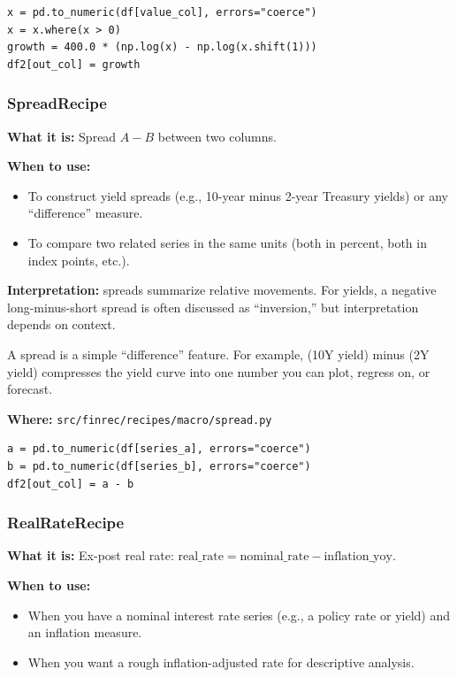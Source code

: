 \documentclass[11pt,a4paper]{article}
\begin{document}
\begin{lstlisting}
x = pd.to_numeric(df[value_col], errors="coerce")
x = x.where(x > 0)
growth = 400.0 * (np.log(x) - np.log(x.shift(1)))
df2[out_col] = growth
\end{lstlisting}

\subsubsection{SpreadRecipe}\label{sec:spread}

\textbf{What it is:} Spread $A - B$ between two columns.

\textbf{When to use:}
\begin{itemize}[leftmargin=2em]
  \item To construct yield spreads (e.g., 10-year minus 2-year Treasury yields) or any ``difference'' measure.
  \item To compare two related series in the same units (both in percent, both in index points, etc.).
\end{itemize}

\textbf{Interpretation:} spreads summarize relative movements. For yields, a negative long-minus-short spread is often discussed as ``inversion,'' but interpretation depends on context.

\begin{intuitionbox}
A spread is a simple ``difference'' feature. For example, (10Y yield) minus (2Y yield) compresses the yield curve into one number you can plot, regress on, or forecast.
\end{intuitionbox}

\textbf{Where:} \texttt{src/finrec/recipes/macro/spread.py}

\begin{lstlisting}
a = pd.to_numeric(df[series_a], errors="coerce")
b = pd.to_numeric(df[series_b], errors="coerce")
df2[out_col] = a - b
\end{lstlisting}

\subsubsection{RealRateRecipe}\label{sec:real-rate}

\textbf{What it is:} Ex-post real rate: $\text{real\_rate} = \text{nominal\_rate} - \text{inflation\_yoy}$.

\textbf{When to use:}
\begin{itemize}[leftmargin=2em]
  \item When you have a nominal interest rate series (e.g., a policy rate or yield) and an inflation measure.
  \item When you want a rough inflation-adjusted rate for descriptive analysis.
\end{itemize}
\end{document}
